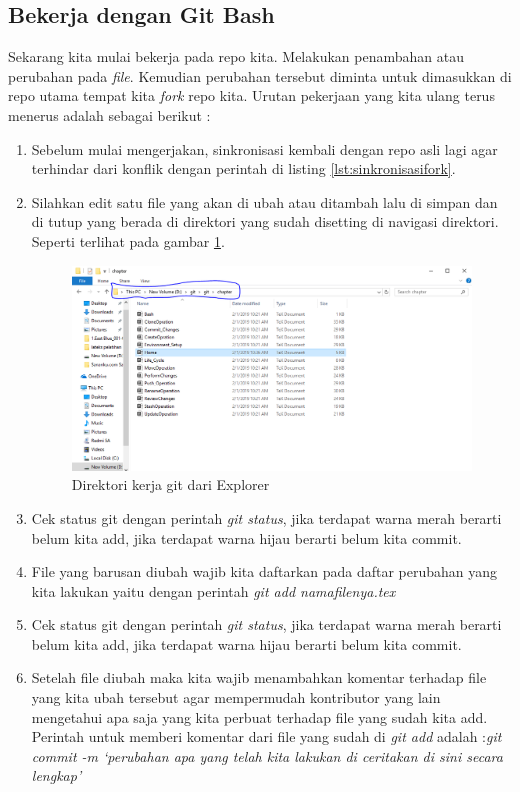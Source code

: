 \subsection{Bekerja dengan Git Bash}
Sekarang kita mulai bekerja pada repo kita. Melakukan penambahan atau perubahan pada \textit{file}. Kemudian perubahan tersebut diminta untuk dimasukkan di repo utama tempat kita \textit{fork} repo kita. Urutan pekerjaan yang kita ulang terus menerus adalah sebagai berikut :
\begin{enumerate}
\item Sebelum mulai mengerjakan, sinkronisasi kembali dengan repo asli lagi agar terhindar dari konflik dengan perintah di listing \ref{lst:sinkronisasifork}.

\item Silahkan edit satu file yang akan di ubah atau ditambah lalu di simpan dan di tutup yang berada di direktori yang sudah disetting di navigasi direktori. Seperti terlihat pada gambar \ref{penanda}.
    \begin{figure}[!htbp]
        \centering
            \includegraphics[width=.75\textwidth]{Figures/Capture}
            \caption{Direktori kerja git dari Explorer}
        \label{penanda}
    \end{figure}
\item Cek status git dengan perintah \textit{git status}, jika terdapat warna merah berarti belum kita add, jika terdapat warna hijau berarti belum kita commit.
\item File yang barusan diubah wajib kita daftarkan pada daftar perubahan yang kita lakukan yaitu dengan perintah \textit{git add namafilenya.tex}
\item Cek status git dengan perintah \textit{git status}, jika terdapat warna merah berarti belum kita add, jika terdapat warna hijau berarti belum kita commit.
\item Setelah file diubah maka kita wajib menambahkan komentar terhadap file yang kita ubah tersebut agar mempermudah kontributor yang lain mengetahui apa saja yang kita perbuat terhadap file yang sudah kita add. Perintah untuk memberi komentar dari file yang sudah di \textit{git add} adalah :\textit{git commit -m `perubahan apa yang telah kita lakukan di ceritakan di sini secara lengkap'}

\end{enumerate}
